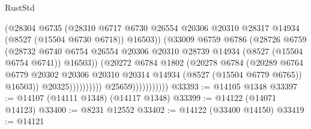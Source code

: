 \begin{lexlean}{RustStd}
\begin{coremodule}
                                          (@28304
                                            @6735
                                            (@28310
                                              @6717
                                              @6730
                                              @26554
                                              @20306
                                              @20310
                                              @28317
                                              @14934
                                              (@8527 (@15504 @6730 @6718))
                                              @16503))
                                          (@33009
                                            @6759
                                            @6786
                                            (@28726
                                              @6759
                                              (@28732
                                                @6740
                                                @6754
                                                @26554
                                                @20306
                                                @20310
                                                @28739
                                                @14934
                                                (@8527 (@15504 @6754 @6741))
                                                @16503))
                                            (@20272
                                              @6784
                                              @1802
                                              (@20278
                                                @6784
                                                (@20289
                                                  @6764
                                                  @6779
                                                  @20302
                                                  @20306
                                                  @20310
                                                  @20314
                                                  @14934
                                                  (@8527 (@15504 @6779 @6765))
                                                  @16503))
                                              @20325))))))))))
                          @25659)))))))))))
@33393 := @14105 @1348
@33397 := @14107 (@14111 @1348) (@14117 @1348)
@33399 := @14122 (@14071 @14123)
@33400 := @8231 @12552
@33402 := @14122 (@33400 @14150)
@33419 := @14121

\end{coremodule}
\end{lexlean}
